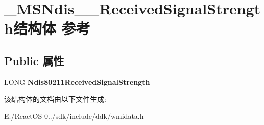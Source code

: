 \hypertarget{struct___m_s_ndis__80211___received_signal_strength}{}\section{\+\_\+\+M\+S\+Ndis\+\_\+\_\+\+Received\+Signal\+Strength结构体 参考}
\label{struct___m_s_ndis__80211___received_signal_strength}
\subsection*{Public 属性}
\begin{DoxyCompactItemize}
\item 
\mbox{\label{struct___m_s_ndis__80211___received_signal_strength_a74e2797e008828c2ed5dc5248bd7f5d4}} 
L\+O\+NG {\bfseries Ndis80211\+Received\+Signal\+Strength}
\end{DoxyCompactItemize}


该结构体的文档由以下文件生成\+:\begin{DoxyCompactItemize}
\item 
E\+:/\+React\+O\+S-\/0../sdk/include/ddk/wmidata.\+h\end{DoxyCompactItemize}
